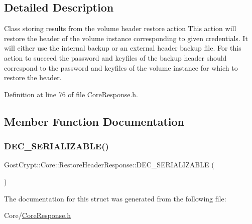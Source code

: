 \subsection{Detailed Description}
Class storing results from the volume header restore action This action will restore the header of the volume instance corresponding to given credentials. It will either use the internal backup or an external header backup file. For this action to succeed the password and keyfiles of the backup header should correspond to the password and keyfiles of the volume instance for which to restore the header. 

Definition at line 76 of file Core\+Response.\+h.



\subsection{Member Function Documentation}
\mbox{\label{struct_gost_crypt_1_1_core_1_1_restore_header_response_a9f6d531584a450e5f5c2767d4b78cfa6}} 
\subsubsection{\texorpdfstring{D\+E\+C\+\_\+\+S\+E\+R\+I\+A\+L\+I\+Z\+A\+B\+L\+E()}{DEC\_SERIALIZABLE()}}
{\footnotesize\ttfamily Gost\+Crypt\+::\+Core\+::\+Restore\+Header\+Response\+::\+D\+E\+C\+\_\+\+S\+E\+R\+I\+A\+L\+I\+Z\+A\+B\+LE (\begin{DoxyParamCaption}\item[{\hyperlink{struct_gost_crypt_1_1_core_1_1_restore_header_response}{Restore\+Header\+Response}}]{ }\end{DoxyParamCaption})}



The documentation for this struct was generated from the following file\+:\begin{DoxyCompactItemize}
\item 
Core/\hyperlink{_core_response_8h}{Core\+Response.\+h}\end{DoxyCompactItemize}
